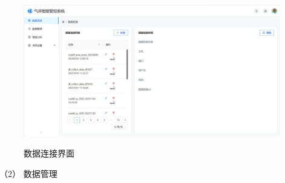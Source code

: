 \begin{figure}[H]
    \centering
    \caption{数据连接界面}
    \includegraphics[width=.8\linewidth]{figure/数据连接.pdf}
    \label{fig:dataconre}
\end{figure}

（2） 数据管理

